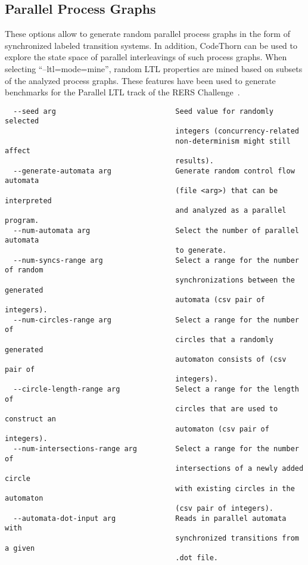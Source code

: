 \documentclass[natbib]{article}
\newcommand{\enquote}[1]{``#1''}
\begin{document}
\subsection{Parallel Process Graphs}
These options allow to generate random parallel process graphs in the form of synchronized labeled transition systems.
In addition, CodeThorn can be used to explore the state space of parallel interleavings of such process graphs. 
When selecting \enquote{--ltl=mode=mine}, random LTL properties are mined based on subsets of the analyzed process graphs. 
These features have been used to generate benchmarks for the Parallel LTL track of the RERS Challenge~\cite{jasper2017rers}.
\begin{verbatim}
  --seed arg                            Seed value for randomly selected 
                                        integers (concurrency-related 
                                        non-determinism might still affect 
                                        results).
  --generate-automata arg               Generate random control flow automata 
                                        (file <arg>) that can be interpreted 
                                        and analyzed as a parallel program.
  --num-automata arg                    Select the number of parallel automata 
                                        to generate.
  --num-syncs-range arg                 Select a range for the number of random
                                        synchronizations between the generated 
                                        automata (csv pair of integers).
  --num-circles-range arg               Select a range for the number of 
                                        circles that a randomly generated 
                                        automaton consists of (csv pair of 
                                        integers).
  --circle-length-range arg             Select a range for the length of 
                                        circles that are used to construct an 
                                        automaton (csv pair of integers).
  --num-intersections-range arg         Select a range for the number of 
                                        intersections of a newly added circle 
                                        with existing circles in the automaton 
                                        (csv pair of integers).
  --automata-dot-input arg              Reads in parallel automata with 
                                        synchronized transitions from a given 
                                        .dot file.

\end{verbatim}
\end{document}
